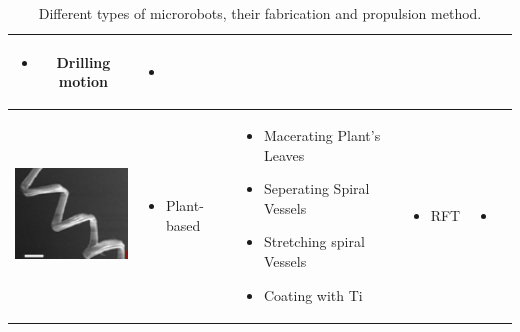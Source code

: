 \documentclass[12pt,a4paper,titlepage]{report}
\begin{document}
\begin{table}[h!]
\begin{tabular}{ c m{2.5cm}  m{4.3cm} m{3cm} m{2cm}}
  \begin{itemize}
        \item Drilling motion
   
      \end{itemize}


	&
	   \begin{itemize}
        \item \citep{C2NR32798H}
   
      \end{itemize}
    \\ \hline


 \begin{minipage}{.3\textwidth}
      \includegraphics[width=\linewidth, height=25mm]{plant_ta}
    \end{minipage}
    &
    \begin{minipage}[t]{3cm}
      \begin{itemize}
        \item Plant-based
      
      \end{itemize}
    \end{minipage}
    & 
    \begin{minipage}[t]{4cm}
      \begin{itemize}
        \item Macerating Plant\rq{}s Leaves
	\item Seperating Spiral Vessels
	\item Stretching spiral Vessels
	\item Coating with Ti

      \end{itemize}
    \end{minipage}
	&

	   \begin{itemize}
        \item RFT
   
      \end{itemize}

	&
	   \begin{itemize}
        \item \citep{gao2013bioinspired}
   
      \end{itemize}
    \\ \hline









  \end{tabular}
  
  \caption[Summery of microrobots\rq{}s desing, locomotion and fabrication]{Different types 
of microrobots, their fabrication and propulsion method.}\label{Micro}
\end{table}
\end{document}

